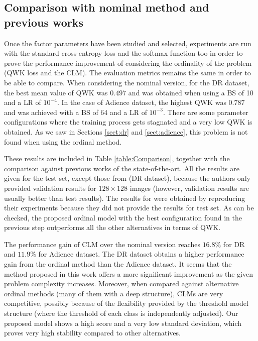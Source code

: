 \documentclass[preprint]{elsarticle}
\begin{document}
\subsection{Comparison with nominal method and previous works}
\label{sect:NominalComparison}
Once the factor parameters have been studied and selected, experiments are run with the standard cross-entropy loss and the softmax function too in order to prove the performance improvement of considering the ordinality of the problem (QWK loss and the CLM). The evaluation metrics remains the same in order to be able to compare. When considering the nominal version, for the DR dataset, the best mean value of QWK was $0.497$ and was obtained when using a BS of 10 and a LR of $10^{-4}$. In the case of Adience dataset, the highest QWK was $0.787$ and was achieved with a BS of 64 and a LR of $10^{-3}$. There are some parameter configurations where the training process gets stagnated and a very low QWK is obtained. As we saw in Sections \ref{sect:dr} and \ref{sect:adience}, this problem is not found when using the ordinal method. 

These results are included in Table \ref{table:Comparison}, together with the comparison against previous works of the state-of-the-art. All the results are given for the test set, except those from \cite{de2018weighted} (DR dataset), because the authors only provided validation results for $128\times 128$ images (however, validation results are usually better than test results). The results for \cite{beckham2017unimodal} were obtained by reproducing their experiments because they did not provide the results for test set. As can be checked, the proposed ordinal model with the best configuration found in the previous step outperforms all the other alternatives in terms of QWK. 

The performance gain of CLM over the nominal version reaches $16.8\%$ for DR and $11.9\%$ for Adience dataset. The DR dataset obtains a higher performance gain from the ordinal method than the Adience dataset. It seems that the method proposed in this work offers a more significant improvement as the given problem complexity increases. Moreover, when compared against alternative ordinal methods (many of them with a deep structure), CLMs are very competitive, possibly because of the flexibility provided by the threshold model structure (where the threshold of each class is independently adjusted). Our proposed model shows a high score and a very low standard deviation, which proves very high stability compared to other alternatives.
\end{document}
